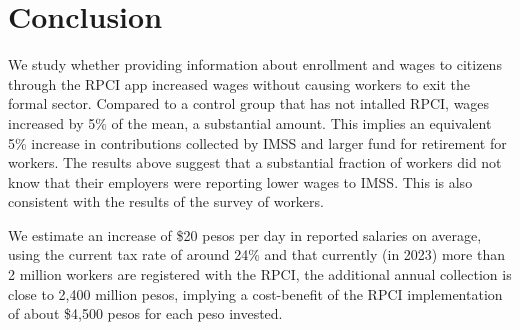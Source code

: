 \documentclass[oneside,11pt]{article}
\begin{document}


\section{Conclusion} \label{Conclusion}

We study whether providing information about enrollment and wages to citizens through the RPCI app increased wages without causing workers to exit the formal sector. Compared to a control group that has not intalled RPCI, wages increased by 5\% of the mean, a substantial amount. This implies an equivalent 5\% increase in contributions collected by IMSS and larger fund for retirement for workers. The results above suggest that a substantial fraction of workers did not know that their employers were reporting lower wages to IMSS. This is also consistent with the results of the survey of workers. 

We estimate an increase of \$20 pesos per day in reported salaries on average, using the current tax rate of around 24\% and that currently (in 2023) more than 2 million workers are registered with the RPCI, the additional annual collection is close to 2,400 million pesos, implying a cost-benefit of the RPCI implementation of about \$4,500 pesos for each peso invested.
\end{document}

